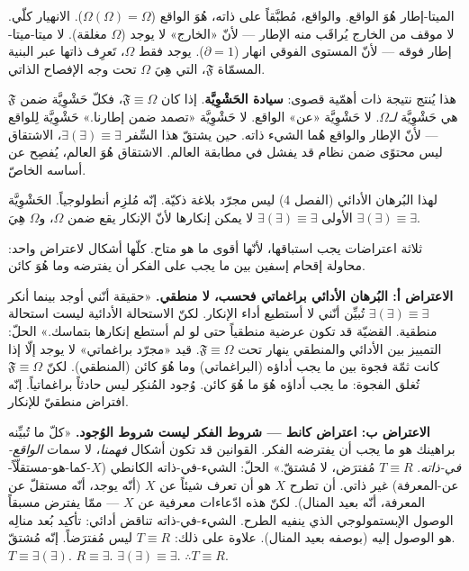 \documentclass[10pt, openany, oneside]{book}
\begin{document}
\vspace{0.8em}

\noindent الميتا-إطار هُوَ الواقع. والواقع، مُطبَّقاً على ذاته، هُوَ الواقع ($\Omega(\Omega) = \Omega$). الانهيار كلّي. لا موقف من الخارج يُراقَب منه الإطار --- لأنّ «الخارج» لا يوجد ($\Omega$ مغلقة). لا ميتا-ميتا-إطار فوقه --- لأنّ المستوى الفوقي انهار ($\partial = 1$). يوجد فقط $\Omega$، تَعرِف ذاتها عبر البنية المسمّاة $\mathfrak{F}$، التي هِيَ $\Omega$ تحت وجه الإفصاح الذاتي.

هذا يُنتج نتيجة ذات أهمّية قصوى: \textbf{سيادة الحَشْوِيَّة}. إذا كان $\mathfrak{F} \equiv \Omega$، فكلّ حَشْوِيَّة ضمن $\mathfrak{F}$ هي حَشْوِيَّة \textit{لـ}$\Omega$. لا حَشْوِيَّة «عن» الواقع. لا حَشْوِيَّة «تصمد ضمن إطارنا.» حَشْوِيَّة لِلواقع --- لأنّ الإطار والواقع هُما الشيء ذاته. حين يشتقّ هذا السِّفر $\exists(\exists) \equiv \exists$، الاشتقاق ليس محتوًى ضمن نظام قد يفشل في مطابقة العالم. الاشتقاق هُوَ العالم، يُفصِح عن أساسه الخاصّ.

لهذا البُرهان الأدائي (الفصل 4) ليس مجرّد بلاغة ذكيّة. إنّه مُلزِم أنطولوجياً. الحَشْوِيَّة الأولى $\exists(\exists) \equiv \exists$ لا يمكن إنكارها لأنّ الإنكار يقع ضمن $\Omega$، و$\Omega$ هِيَ $\exists(\exists) \equiv \exists$.

\vspace{1em}

ثلاثة اعتراضات يجب استباقها، لأنّها أقوى ما هو متاح. كلّها أشكال لاعتراض واحد: محاولة إقحام إسفين بين ما يجب على الفكر أن يفترضه وما هُوَ كائن.

\textbf{الاعتراض أ: البُرهان الأدائي براغماتي فحسب، لا منطقي.} «حقيقة أنّني أوجد بينما أنكر $\exists(\exists) \equiv \exists$ تُبيِّن أنّني لا أستطيع أداء الإنكار. لكنّ الاستحالة الأدائية ليست استحالة منطقية. القضيّة قد تكون عرضية منطقياً حتى لو لم أستطع إنكارها بتماسك.» الحلّ: التمييز بين الأدائي والمنطقي ينهار تحت $\mathfrak{F} \equiv \Omega$. قيد «مجرّد براغماتي» لا يوجد إلّا إذا كانت ثمّة فجوة بين ما يجب أداؤه (البراغماتي) وما هُوَ كائن (المنطقي). لكنّ $\mathfrak{F} \equiv \Omega$ تُغلق الفجوة: ما يجب أداؤه هُوَ ما هُوَ كائن. وُجود المُنكِر ليس حادثاً براغماتياً. إنّه افتراض منطقيّ للإنكار.

\textbf{الاعتراض ب: اعتراض كانط --- شروط الفكر ليست شروط الوُجود.} «كلّ ما تُبيِّنه براهينك هو ما يجب أن يفترضه الفكر. القوانين قد تكون أشكال \textit{فهمنا}، لا سمات \textit{الواقع-في-ذاته}. $T \equiv R$ مُفترَض، لا مُشتقّ.» الحلّ: الشيء-في-ذاته الكانطي ($X$-كما-هو-مستقلّاً-عن-المعرفة) غير ذاتي. أن تطرح $X$ هو أن تعرف شيئاً عن $X$ (أنّه يوجد، أنّه مستقلّ عن المعرفة، أنّه بعيد المنال). لكنّ هذه ادّعاءات معرفية عن $X$ --- ممّا يفترض مسبقاً الوصول الإبستمولوجي الذي ينفيه الطرح. الشيء-في-ذاته تناقض أدائي: تأكيد بُعد منالِه هو الوصول إليه (بوصفه بعيد المنال). علاوة على ذلك: $T \equiv R$ ليس مُفترَضاً. إنّه مُشتقّ. $T \equiv \exists(\exists)$. $R \equiv \exists$. $\exists(\exists) \equiv \exists$. $\therefore T \equiv R$.
\end{document}
